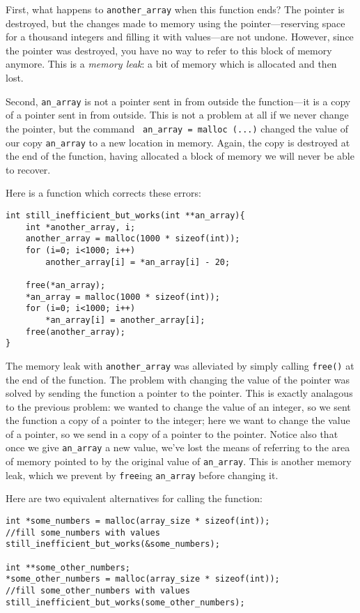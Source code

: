 \documentclass[12pt]{article}
\begin{document}
First, what happens to {\tt another\_array} when this function
ends? The pointer is destroyed, but the changes made to memory using
the pointer---reserving space for a thousand integers and filling it
with values---are not undone. However, since the pointer was destroyed,
you have no way to refer to this block of memory anymore.  This is a
{\sl memory leak}: a bit of memory which is allocated and then lost.

Second, {\tt an\_array} is not a pointer sent in from outside the
function---it is a copy of a pointer sent in from outside. This is not
a problem at all if we never change the pointer, but the command {\tt
an\_array = malloc (...)} changed the value of our copy {\tt an\_array}
to a new location in memory.  Again, the copy is destroyed at the end
of the function, having allocated a block of memory we will never be
able to recover.

Here is a function which corrects these errors:

\begin{verbatim}
int still_inefficient_but_works(int **an_array){
    int *another_array, i;
    another_array = malloc(1000 * sizeof(int));
    for (i=0; i<1000; i++)
        another_array[i] = *an_array[i] - 20;

    free(*an_array);
    *an_array = malloc(1000 * sizeof(int));
    for (i=0; i<1000; i++)
        *an_array[i] = another_array[i];
    free(another_array);
}
\end{verbatim}

The memory leak with {\tt another\_array} was alleviated by simply calling {\tt free()} at the end of the
function. The problem with changing the value of the pointer was solved by sending the function a pointer
to the pointer. This is exactly analagous to the previous problem: we wanted to change the value of an
integer, so we sent the function a copy of a pointer to the integer; here we want to change the value of a
pointer, so we send in a copy of a pointer to the pointer. Notice also that once we give {\tt *an\_array}
a new value, we've lost the means of referring to the area of memory pointed to by the original value of
{\tt *an\_array}. This is another memory leak, which we prevent by {\tt free}ing {\tt *an\_array} before
changing it.

Here are two equivalent alternatives for calling the function:
\begin{verbatim}
int *some_numbers = malloc(array_size * sizeof(int));
//fill some_numbers with values
still_inefficient_but_works(&some_numbers);

int **some_other_numbers;
*some_other_numbers = malloc(array_size * sizeof(int));
//fill some_other_numbers with values
still_inefficient_but_works(some_other_numbers);
\end{verbatim}
\end{document}
